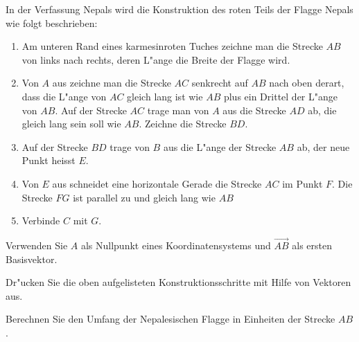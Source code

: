 In der Verfassung Nepals wird die Konstruktion des roten Teils der
Flagge Nepals wie folgt beschrieben:
\begin{enumerate}
\item Am unteren Rand eines karmesinroten Tuches zeichne man die Strecke
$AB$ von links nach rechts, deren L"ange die Breite der Flagge wird.
\item Von $A$ aus zeichne man die Strecke $AC$ senkrecht auf $AB$ nach
oben derart, dass die L"ange von $AC$ gleich lang ist wie $AB$ plus
ein Drittel der L"ange von $AB$.
Auf der Strecke $AC$ trage man von $A$ aus die Strecke $AD$ ab, die
gleich lang sein soll wie $AB$.
Zeichne die Strecke $BD$.
\item Auf der Strecke $BD$ trage von $B$ aus die L"ange der Strecke $AB$ ab,
der neue Punkt heisst $E$.
\item Von $E$ aus schneidet eine horizontale Gerade die Strecke $AC$ im
Punkt $F$.
Die Strecke $FG$ ist parallel zu und gleich lang wie $AB$
\item Verbinde $C$ mit $G$.
\end{enumerate}
\begin{center}
\qquad
\qquad
\qquad
{}
\end{center}
Verwenden Sie $A$ als Nullpunkt eines Koordinatensystems und $\overrightarrow{AB}$
als ersten Basisvektor.
\begin{teilaufgaben}
\item
Dr"ucken Sie die oben aufgelisteten Konstruktionsschritte mit Hilfe
von Vektoren aus.
\item
Berechnen Sie den Umfang der Nepalesischen Flagge in Einheiten der Strecke
$AB$.
\end{teilaufgaben}

